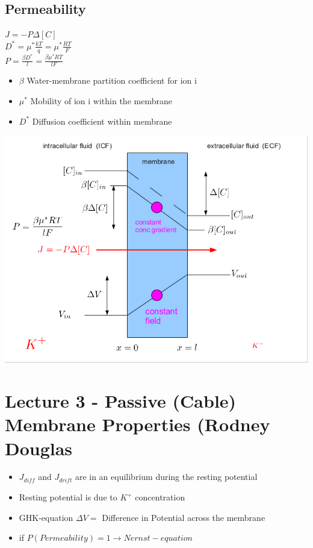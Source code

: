 \documentclass[english,11pt]{article}
\begin{document}
\subsection{Permeability}

$J = -P\Delta[C]$\\
$ D^* = \mu^* \frac{kT}{q} = \mu^* \frac{RT}{F}$\\
$P = \frac{\beta D^*}{l} = \frac{\beta \mu^* RT}{lF}$\\

\begin{itemize}
\item $\beta$  Water-membrane partition coefficient for ion i
\item $\mu^*$ Mobility of ion i within the membrane
\item $D^*$ Diffusion coefficient within membrane
\end{itemize}



\includegraphics[width=\textwidth]{fluid-equations2.png}


\section{Lecture 3 - Passive (Cable) Membrane Properties (Rodney Douglas}

\begin{itemize}
\item $J_{diff}$ and $J_{drift}$ are in an equilibrium during the resting potential
\item Resting potential is due to $K^+$ concentration
\item GHK-equation $\Delta V = $ Difference in Potential across the membrane
\item if $P(Permeability) = 1 \rightarrow Nernst-equation$
\end{itemize}
\end{document}

